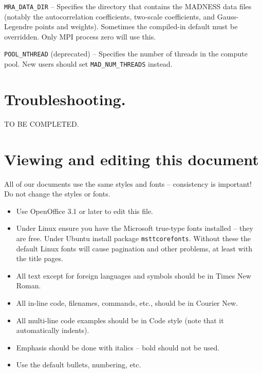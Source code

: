 \documentclass[letterpaper]{article}
\newcommand\liststyleLviii{%
\renewcommand\labelitemi{{\textbullet}}
\renewcommand\labelitemii{${\circ}$}
\renewcommand\labelitemiii{${\blacksquare}$}
\renewcommand\labelitemiv{{\textbullet}}
}
\begin{document}
\texttt{MRA\_DATA\_DIR} -- Specifies the directory that contains the MADNESS data files (notably the autocorrelation
coefficients, two-scale coefficients, and Gauss-Legendre points and weights). Sometimes the compiled-in default must be
overridden. Only MPI process zero will use this.

\texttt{POOL\_NTHREAD} (deprecated) -- Specifies the number of threads in the compute pool. New users should set
\texttt{MAD\_NUM\_THREADS} instead.

\section{Troubleshooting.}
TO BE COMPLETED.

\section{Viewing and editing this document}
All of our documents use the same styles and fonts -- consistency is important! Do not change the styles or fonts.

\liststyleLviii
\begin{itemize}
\item Use OpenOffice 3.1 or later to edit this file.
\item Under Linux ensure you have the Microsoft true-type fonts installed -- they are free. Under Ubuntu install package
\texttt{msttcorefonts}. Without these the default Linux fonts will cause pagination and other problems, at least with
the title pages.
\item All text except for foreign languages and symbols should be in Times New Roman.
\item All in-line code, filenames, commands, etc., should be in Courier New.
\item All multi-line code examples should be in Code style (note that it automatically indents).
\item Emphasis should be done with italics -- bold should not be used.
\item Use the default bullets, numbering, etc.
\end{itemize}

\bigskip
\end{document}
